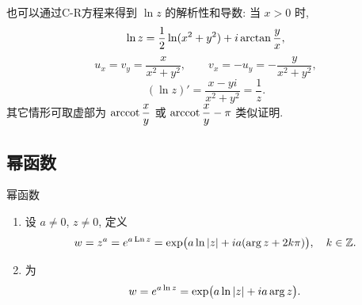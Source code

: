 也可以通过C-R方程来得到 $\ln z$ 的解析性和导数: 当 $x>0$ 时,
\[\ln z=\frac{1}{2} \ln(x^2+y^2)+i\arctan \frac yx,\]
\[u_x=v_y=\frac x{x^2+y^2},\qquad v_x=-u_y=-\frac y{x^2+y^2},\]
\[(\ln z)'=\frac{x-yi}{x^2+y^2}=\frac 1z.\]
其它情形可取虚部为 $\operatorname{arccot}\dfrac xy$ 或 $\operatorname{arccot}\dfrac xy-\pi$ 类似证明.

\subsection{幂函数}

\begin{definition}{幂函数}
  \begin{enumerate}
    \item 设 $a\neq 0$, $z\neq 0$, 定义
    \[w=z^a=e^{a\operatorname{Ln} z}
    =\exp\bigl(a\ln\left|z\right|+ia(\arg z+2k\pi)\bigr),\quad k\in{\mathbb{Z}}.\]
    \item {}为
    \[w=e^{a\ln z}=\exp\bigl(a\ln\left|z\right|+ia\arg z\bigr).\]
  \end{enumerate}
\end{definition}

